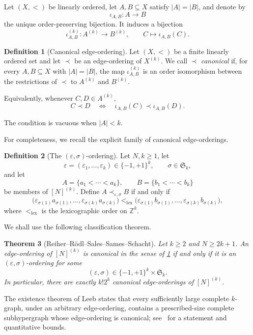 \documentclass[11pt]{amsart}
\newtheorem{theorem}{Theorem}[section]
\theoremstyle{definition}
\newtheorem{definition}[theorem]{Definition}
\newcommand{\Z}{\mathbb{Z}}
\newcommand{\eps}{\varepsilon}
\newcommand{\Sym}{\mathfrak{S}}
\begin{document}
Let $(X,<)$ be linearly ordered, let $A,B\subseteq X$ satisfy $|A|=|B|$, and denote by
\[
\iota_{A,B}:A\longrightarrow B
\]
the unique order-preserving bijection. It induces a bijection
\[
\iota_{A,B}^{(k)}:A^{(k)}\longrightarrow B^{(k)},
\qquad
C\longmapsto \iota_{A,B}(C).
\]

\begin{definition}[Canonical edge-ordering]\label{def:canonical}
Let $(X,<)$ be a finite linearly ordered set and let $\prec$ be an edge-ordering of $X^{(k)}$. We call $\prec$ \emph{canonical} if, for every $A,B\subseteq X$ with $|A|=|B|$, the map $\iota_{A,B}^{(k)}$ is an order isomorphism between the restrictions of $\prec$ to $A^{(k)}$ and $B^{(k)}$.

Equivalently, whenever $C,D\in A^{(k)}$,
\[
C\prec D
\quad\Longleftrightarrow\quad
\iota_{A,B}(C)\prec \iota_{A,B}(D).
\]
\end{definition}

The condition is vacuous when $|A|<k$.

For completeness, we recall the explicit family of canonical edge-orderings.

\begin{definition}[The $(\eps,\sigma)$-ordering]\label{def:epssigma}
Let $N,k\ge1$, let
\[
\eps=(\eps_1,\dots,\eps_k)\in\{-1,+1\}^k,
\qquad
\sigma\in\Sym_k,
\]
and let
\[
A=\{a_1<\cdots<a_k\},
\qquad
B=\{b_1<\cdots<b_k\}
\]
be members of $[N]^{(k)}$. Define $A\prec_{\eps,\sigma}B$ if and only if
\[
\bigl(\eps_{\sigma(1)}a_{\sigma(1)},\dots,
      \eps_{\sigma(k)}a_{\sigma(k)}\bigr)
<_{\mathrm{lex}}
\bigl(\eps_{\sigma(1)}b_{\sigma(1)},\dots,
      \eps_{\sigma(k)}b_{\sigma(k)}\bigr),
\]
where $<_{\mathrm{lex}}$ is the lexicographic order on $\Z^k$.
\end{definition}

We shall use the following classification theorem.

\begin{theorem}[Reiher--R\"odl--Sales--Sames--Schacht]\label{thm:classification}
Let $k\ge 2$ and $N\ge 2k+1$. An edge-ordering of $[N]^{(k)}$ is canonical in the sense of \cref{def:canonical} if and only if it is an $(\eps,\sigma)$-ordering for some
\[
(\eps,\sigma)\in\{-1,+1\}^k\times\Sym_k.
\]
In particular, there are exactly $k!2^k$ canonical edge-orderings of $[N]^{(k)}$.
\end{theorem}

The existence theorem of Leeb states that every sufficiently large complete $k$-graph, under an arbitrary edge-ordering, contains a prescribed-size complete subhypergraph whose edge-ordering is canonical; see~\cite{RRSSS2022} for a statement and quantitative bounds.
\end{document}
